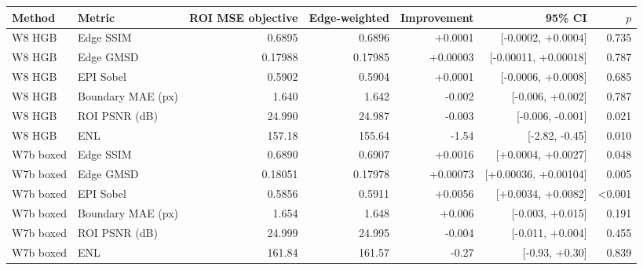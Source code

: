 \begin{tabular}{llrrrrr}
\toprule
Method & Metric & ROI MSE objective & Edge-weighted & Improvement & 95\% CI & $p$ \\
\midrule
W8 HGB & Edge SSIM & 0.6895 & 0.6896 & +0.0001 & [-0.0002, +0.0004] & 0.735 \\
W8 HGB & Edge GMSD & 0.17988 & 0.17985 & +0.00003 & [-0.00011, +0.00018] & 0.787 \\
W8 HGB & EPI Sobel & 0.5902 & 0.5904 & +0.0001 & [-0.0006, +0.0008] & 0.685 \\
W8 HGB & Boundary MAE (px) & 1.640 & 1.642 & -0.002 & [-0.006, +0.002] & 0.787 \\
W8 HGB & ROI PSNR (dB) & 24.990 & 24.987 & -0.003 & [-0.006, -0.001] & 0.021 \\
W8 HGB & ENL & 157.18 & 155.64 & -1.54 & [-2.82, -0.45] & 0.010 \\
\midrule
W7b boxed & Edge SSIM & 0.6890 & 0.6907 & +0.0016 & [+0.0004, +0.0027] & 0.048 \\
W7b boxed & Edge GMSD & 0.18051 & 0.17978 & +0.00073 & [+0.00036, +0.00104] & 0.005 \\
W7b boxed & EPI Sobel & 0.5856 & 0.5911 & +0.0056 & [+0.0034, +0.0082] & <0.001 \\
W7b boxed & Boundary MAE (px) & 1.654 & 1.648 & +0.006 & [-0.003, +0.015] & 0.191 \\
W7b boxed & ROI PSNR (dB) & 24.999 & 24.995 & -0.004 & [-0.011, +0.004] & 0.455 \\
W7b boxed & ENL & 161.84 & 161.57 & -0.27 & [-0.93, +0.30] & 0.839 \\
\bottomrule
\end{tabular}
